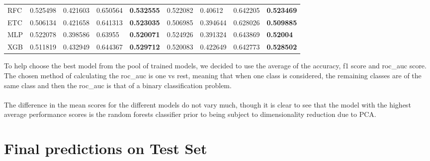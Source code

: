 \documentclass[a4paper,12pt]{article}
\begin{document}
\begin{table}[H]
\begin{tabular}{@{}lllllllll@{}}
			RFC                                         & 0.525498                 & 0.421603                & 0.650564                     & \textbf{0.532555}                  & 0.522082                 & 0.40612                 & 0.642205                     & \textbf{0.523469}                  \\
			ETC                                         & 0.506134                 & 0.421658                & 0.641313                     & \textbf{0.523035}                  & 0.506985                 & 0.394644                & 0.628026                     & \textbf{0.509885}                  \\
			MLP                                         & 0.522078                 & 0.398586                & 0.63955                      & \textbf{0.520071}                  & 0.524926                 & 0.391324                & 0.643869                     & \textbf{0.52004}                   \\
			XGB                                         & 0.511819                 & 0.432949                & 0.644367                     & \textbf{0.529712}                  & 0.520083                 & 0.422649                & 0.642773                     & \textbf{0.528502}                  \\ \bottomrule
		\end{tabular}
	\end{table}
	
	To help choose the best model from the pool of trained models, we decided to use the average of the accuracy, f1 score and roc\_auc score. The chosen method of calculating the roc\_auc is one vs rest, meaning that when one class is considered, the remaining classes are of the same class and then the roc\_auc is that of a binary classification problem.\\
	\\
	The difference in the mean scores for the different models do not vary much, though it is clear to see that the model with the highest average performance scores is the random forests classifier prior to being subject to dimensionality reduction due to PCA. 
	
	\section{Final predictions on Test Set}
	
\end{document}
